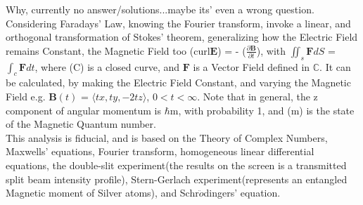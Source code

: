\documentclass[a4paper, 10pt, onepage]{elegantbook}
\begin{document}
Why, currently no answer/solutions...maybe its' even a wrong question. Considering Faradays' Law, knowing the Fourier transform, invoke a linear, and orthogonal transformation of Stokes' theorem, generalizing how the Electric Field remains Constant, the Magnetic Field too (curl$\mathbf E$) = - ($\frac{\partial \mathbf B}{\partial t}$), with $\iint_s \mathbf F dS$ = $\int_c \mathbf F dt$, where (C) is a closed curve, and $\mathbf F$ is a Vector Field defined in $\mathbb C$. It can be calculated, by making the Electric Field Constant, and varying the Magnetic Field e.g.
$\mathbf B(t)$ = $\langle tx, ty, -2tz \rangle$, $0<t<\infty$. Note that in general, the z component of angular momentum is $\hbar$m, with probability 1, and (m) is the state of the Magnetic Quantum number.  \\
This analysis is fiducial, and is based on the Theory of Complex Numbers, Maxwells' equations, Fourier transform, homogeneous linear differential equations, the double-slit experiment(the results on the screen is a transmitted split beam intensity profile), Stern-Gerlach experiment(represents an entangled Magnetic moment of Silver atoms), and Schr$\ddot{o}$dingers' equation.  \\


\noindent
\end{document}
